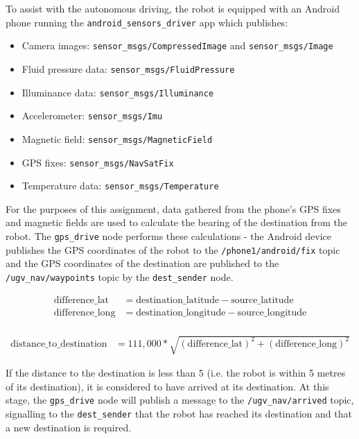 \documentclass[titlepage,12pt,a4paper]{article}
\begin{document}
To assist with the autonomous driving, the robot is equipped with an Android phone running the \verb|android_sensors_driver| app which publishes:

\begin{itemize}
	\item Camera images: \verb|sensor_msgs/CompressedImage| and \verb|sensor_msgs/Image|
	\item Fluid pressure data: \verb|sensor_msgs/FluidPressure|
	\item Illuminance data: \verb|sensor_msgs/Illuminance|
	\item Accelerometer: \verb|sensor_msgs/Imu|
	\item Magnetic field: \verb|sensor_msgs/MagneticField|
	\item GPS fixes: \verb|sensor_msgs/NavSatFix|
	\item Temperature data: \verb|sensor_msgs/Temperature| \\
\end{itemize}

For the purposes of this assignment, data gathered from the phone's GPS fixes and magnetic fields are used to calculate the bearing of the destination from the robot. The \verb|gps_drive| node performs these calculations - the Android device publishes the GPS coordinates of the robot to the \verb|/phone1/android/fix| topic and the GPS coordinates of the destination are published to the \verb|/ugv_nav/waypoints| topic by the \verb|dest_sender| node.

\begin{align*}
	\text{difference\_lat}   	&= 	\text{destination\_latitude} - \text{source\_latitude} \\
	\text{difference\_long}	&= 	\text{destination\_longitude} - \text{source\_longitude} \\
\end{align*}


\begin{align*}
	\text{distance\_to\_destination}	&= 	111,000 * \sqrt{(\text{difference\_lat})^2 + (\text{difference\_long})^2}
\end{align*}

If the distance to the destination is less than 5 (i.e. the robot is within 5 metres of its destination), it is considered to have arrived at its destination. At this stage, the \verb|gps_drive| node will publish a message to the \verb|/ugv_nav/arrived| topic, signalling to the \verb|dest_sender| that the robot has reached its destination and that a new destination is required.
\end{document}
